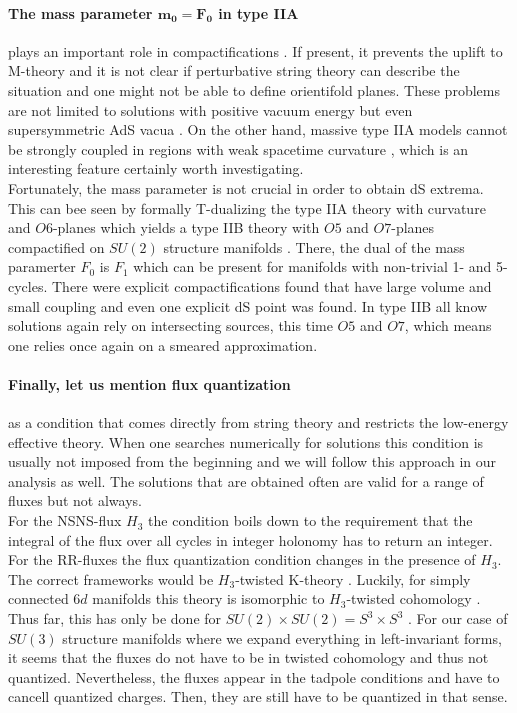 \documentclass[12pt]{report}
\begin{document}
\paragraph{The mass parameter $\mathbf{m_0 = F_0}$ in type IIA} plays an important role in compactifications \cite{Romans:1985tz}. If present, it prevents the uplift to M-theory and it is not clear if perturbative string theory can describe the situation and one might not be able to define orientifold planes. These problems are not limited to solutions with positive vacuum energy but even supersymmetric AdS vacua \cite{Banks:2006hg}. On the other hand, massive type IIA models cannot be strongly coupled in regions with weak spacetime curvature \cite{Aharony:2010af}, which is an interesting feature certainly worth investigating.\\
Fortunately, the mass parameter is not crucial in order to obtain dS extrema. This can bee seen by formally T-dualizing the type IIA theory with curvature and $O6$-planes which yields a type IIB theory with $O5$ and $O7$-planes compactified on $SU(2)$ structure manifolds \cite{Caviezel:2009tu}. There, the dual of the mass paramerter $F_0$ is $F_1$ which can be present for manifolds with non-trivial 1- and 5-cycles. There were explicit compactifications found that have large volume and small coupling and even one explicit dS point was found. In type IIB all know solutions again rely on intersecting sources, this time $O5$ and $O7$, which means one relies once again on a smeared approximation.
\paragraph{Finally, let us mention flux quantization} as a condition that comes directly from string theory and restricts the low-energy effective theory. When one searches numerically for solutions this condition is usually not imposed from the beginning and we will follow this approach in our analysis as well. The solutions that are obtained often are valid for a range of fluxes but not always.\\
For the NSNS-flux $H_3$ the condition boils down to the requirement that the integral of the flux over all cycles in integer holonomy has to return an integer. For the RR-fluxes the flux quantization condition changes in the presence of $H_3$. The correct frameworks would be $H_3$-twisted K-theory \cite{Moore:1999gb,Minasian:1997mm}. Luckily, for simply connected $6d$ manifolds this theory is isomorphic to $H_3$-twisted cohomology \cite{Collinucci:2006ug}. Thus far, this has only be done for $SU(2)\times SU(2) = S^ 3 \times S^ 3$ \cite{Danielsson:2011au}.
For our case of $SU(3)$ structure manifolds where we expand everything in left-invariant forms, it seems that the fluxes do not have to be in twisted cohomology and thus not quantized. Nevertheless, the fluxes appear in the tadpole conditions and have to cancell quantized charges. Then, they are still have to be quantized in that sense.
\end{document}
